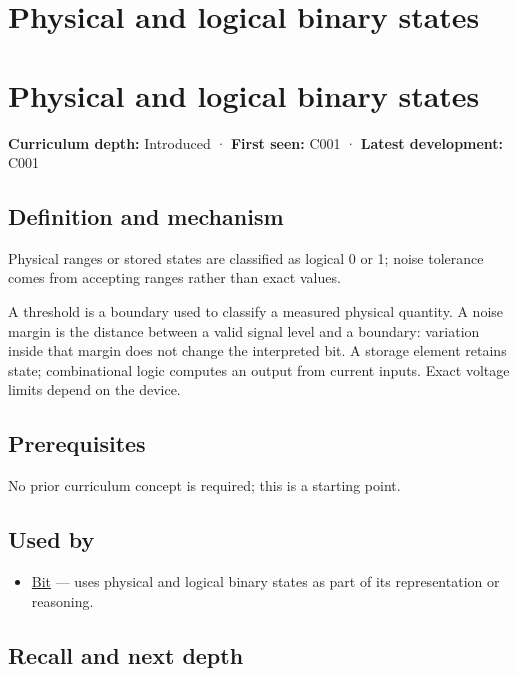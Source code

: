 \hypertarget{appendix-ea798b1ceb35}{}
\section*{Physical and logical binary states}
\section{Physical and logical binary states}\label{physical-and-logical-binary-states}

\textbf{Curriculum depth:} Introduced · \textbf{First seen:} C001 · \textbf{Latest development:} C001

\subsection{Definition and mechanism}\label{definition-and-mechanism}

Physical ranges or stored states are classified as logical 0 or 1; noise tolerance comes from accepting ranges rather than exact values.

A threshold is a boundary used to classify a measured physical quantity. A noise margin is the distance between a valid signal level and a boundary: variation inside that margin does not change the interpreted bit. A storage element retains state; combinational logic computes an output from current inputs. Exact voltage limits depend on the device.

\subsection{Prerequisites}\label{prerequisites}

No prior curriculum concept is required; this is a starting point.

\subsection{Used by}\label{used-by}

\begin{itemize}
\tightlist
\item
  \hyperref[appendix-ddbb69998a2e]{Bit} --- uses physical and logical binary states as part of its representation or reasoning.
\end{itemize}

\subsection{Recall and next depth}\label{recall-and-next-depth}

